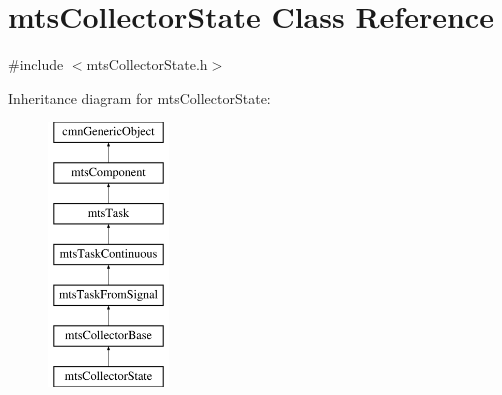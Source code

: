 \hypertarget{classmts_collector_state}{}\section{mts\+Collector\+State Class Reference}
\label{classmts_collector_state}


{\ttfamily \#include $<$mts\+Collector\+State.\+h$>$}

Inheritance diagram for mts\+Collector\+State\+:\begin{figure}[H]
\begin{center}
\leavevmode
\includegraphics[height=7.000000cm]{dd/dde/classmts_collector_state}
\end{center}
\end{figure}

